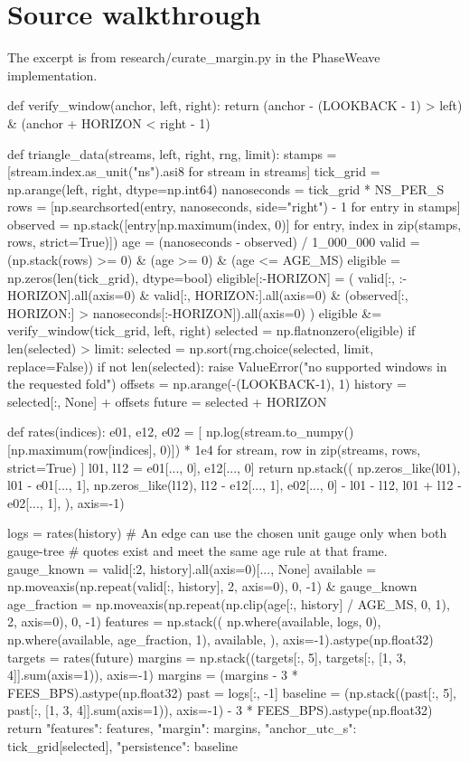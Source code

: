 \documentclass[11pt,oneside,openany]{book}
\begin{document}
\section*{Source walkthrough}
The excerpt is from research/curate\_margin.py in the PhaseWeave implementation.

\begin{BookCode}
def verify_window(anchor, left, right):
    return (anchor - (LOOKBACK - 1) > left) & (anchor + HORIZON < right - 1)
\end{BookCode}
\begin{BookCode}
def triangle_data(streams, left, right, rng, limit):
    stamps = [stream.index.as_unit("ns").asi8 for stream in streams]
    tick_grid = np.arange(left, right, dtype=np.int64)
    nanoseconds = tick_grid * NS_PER_S
    rows = [np.searchsorted(entry, nanoseconds, side="right") - 1 for entry in stamps]
    observed = np.stack([entry[np.maximum(index, 0)] for entry, index in zip(stamps, rows, strict=True)])
    age = (nanoseconds - observed) / 1_000_000
    valid = (np.stack(rows) >= 0) & (age >= 0) & (age <= AGE_MS)
    eligible = np.zeros(len(tick_grid), dtype=bool)
    eligible[:-HORIZON] = (
        valid[:, :-HORIZON].all(axis=0) & valid[:, HORIZON:].all(axis=0) &
        (observed[:, HORIZON:] > nanoseconds[:-HORIZON]).all(axis=0)
    )
    eligible &= verify_window(tick_grid, left, right)
    selected = np.flatnonzero(eligible)
    if len(selected) > limit:
        selected = np.sort(rng.choice(selected, limit, replace=False))
    if not len(selected):
        raise ValueError("no supported windows in the requested fold")
    offsets = np.arange(-(LOOKBACK-1), 1)
    history = selected[:, None] + offsets
    future = selected + HORIZON

    def rates(indices):
        e01, e12, e02 = [
            np.log(stream.to_numpy()[np.maximum(row[indices], 0)]) * 1e4
            for stream, row in zip(streams, rows, strict=True)
        ]
        l01, l12 = e01[..., 0], e12[..., 0]
        return np.stack((
            np.zeros_like(l01), l01 - e01[..., 1],
            np.zeros_like(l12), l12 - e12[..., 1],
            e02[..., 0] - l01 - l12, l01 + l12 - e02[..., 1],
        ), axis=-1)

    logs = rates(history)
    # An edge can use the chosen unit gauge only when both gauge-tree
    # quotes exist and meet the same age rule at that frame.
    gauge_known = valid[:2, history].all(axis=0)[..., None]
    available = np.moveaxis(np.repeat(valid[:, history], 2, axis=0), 0, -1) & gauge_known
    age_fraction = np.moveaxis(np.repeat(np.clip(age[:, history] / AGE_MS, 0, 1), 2, axis=0), 0, -1)
    features = np.stack((
        np.where(available, logs, 0), np.where(available, age_fraction, 1), available,
    ), axis=-1).astype(np.float32)
    targets = rates(future)
    margins = np.stack((targets[:, 5], targets[:, [1, 3, 4]].sum(axis=1)), axis=-1)
    margins = (margins - 3 * FEES_BPS).astype(np.float32)
    past = logs[:, -1]
    baseline = (np.stack((past[:, 5], past[:, [1, 3, 4]].sum(axis=1)), axis=-1) - 3 * FEES_BPS).astype(np.float32)
    return {"features": features, "margin": margins, "anchor_utc_s": tick_grid[selected], "persistence": baseline}
\end{BookCode}
\end{document}
